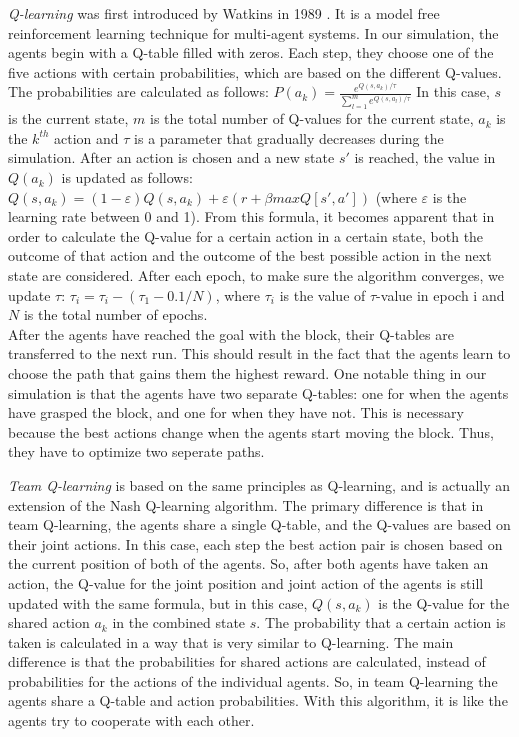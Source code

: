 \textit{Q-learning} was first introduced by Watkins in 1989 \cite{watkins1989}. It is a model free reinforcement learning technique for multi-agent systems. In our simulation, the agents begin with a Q-table filled with zeros. Each step, they choose one of the five actions with certain probabilities, which are based on the different Q-values. The probabilities are calculated as follows: $P(a_{k})=\frac{e^{Q(s,a_{k})/ \tau}}{\sum_{l=1}^{m}e^{Q(s,a_{l})/ \tau}}$ In this case, $s$ is the current state, $m$ is the total number of Q-values for the current state, $a_{k}$ is the $k^{th}$ action and $\tau$ is a parameter that gradually decreases during the simulation. After an action is chosen and a new state $s'$ is reached, the value in $Q(a_{k})$ is updated as follows: $Q(s,a_{k}) = (1- \varepsilon) Q(s,a_{k})+ \varepsilon (r+ \beta maxQ[s',a'])$ (where $\varepsilon$ is the learning rate between 0 and 1). From this formula, it becomes apparent that in order to calculate the Q-value for a certain action in a certain state, both the outcome of that action and the outcome of the best possible action in the next state are considered. After each epoch, to make sure the algorithm converges, we update $\tau$: $\tau_{i} = \tau_{i}-(\tau_{1}-0.1/N)$, where $\tau_{i}$ is the value of $\tau$-value in epoch i and $N$ is the total number of epochs.\\
After the agents have reached the goal with the block, their Q-tables are transferred to the next run. This should result in the fact that the agents learn to choose the path that gains them the highest reward. One notable thing in our simulation is that the agents have two separate Q-tables: one for when the agents have grasped the block, and one for when they have not. This is necessary because the best actions change when the agents start moving the block. Thus, they have to optimize two seperate paths.

\textit{Team Q-learning} is based on the same principles as Q-learning, and is actually an extension of the Nash Q-learning algorithm. The primary difference is that in team Q-learning, the agents share a single Q-table, and the Q-values are based on their joint actions. In this case, each step the best action pair is chosen based on the current position of both of the agents. So, after both agents have taken an action, the Q-value for the joint position and joint action of the agents is still updated with the same formula, but in this case,  $Q(s,a_{k})$ is the Q-value for the shared action $a_{k}$ in the combined state $s$. The probability that a certain action is taken is calculated in a way that is very similar to Q-learning. The main difference is that the probabilities for shared actions are calculated, instead of probabilities for the actions of the individual agents. So, in team Q-learning the agents share a Q-table and action probabilities. With this algorithm, it is like the agents try to cooperate with each other.

